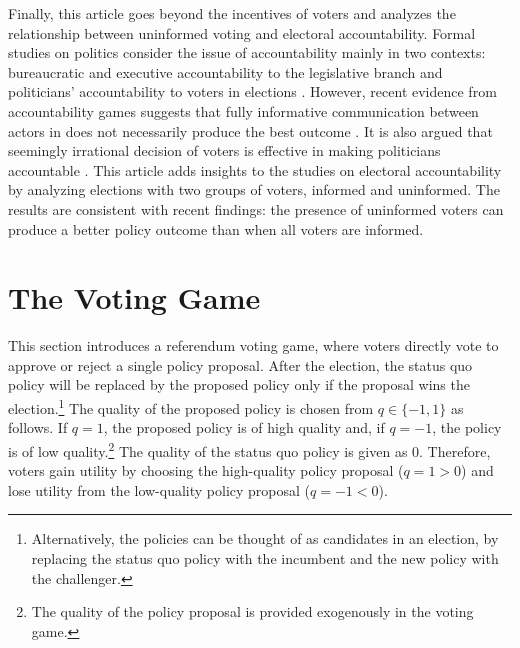 \documentclass[doc,natbib,12pt]{apa6}
\begin{document}
	\par Finally, this article goes beyond the incentives of voters and analyzes the relationship between uninformed voting and electoral accountability. Formal studies on politics consider the issue of accountability mainly in two contexts: bureaucratic and executive accountability to the legislative branch \citep[e.g.,][]{Gailmard2013lewh, Patty2017expo} and politicians' accountability to voters in elections \citep[e.g.,][]{Ashworth2012elac, Prato2016thvo}. However, recent evidence from accountability games suggests that fully informative communication between actors in does not necessarily produce the best outcome \citep{Patty2017expo, Prato2016thvo}. It is also argued that seemingly irrational decision of voters is effective in making politicians accountable \citep{Gailmard2018prpr}. This article adds insights to the studies on electoral accountability by analyzing elections with two groups of voters, informed and uninformed. The results are consistent with recent findings: the presence of uninformed voters can produce a better policy outcome than when all voters are informed. 
	
	\section{The Voting Game}
	
	\par This section introduces a referendum voting game, where voters directly vote to approve or reject a single policy proposal. After the election, the status quo policy will be replaced by the proposed policy only if the proposal wins the election.\footnote{Alternatively, the policies can be thought of as candidates in an election, by replacing the status quo policy with the incumbent and the new policy with the challenger.} The quality of the proposed policy is chosen from $q \in \{-1, 1\}$ as follows. If $q=1$, the proposed policy is of high quality and, if $q=-1$, the policy is of low quality.\footnote{The quality of the policy proposal is provided exogenously in the voting game.} The quality of the status quo policy is given as $0$. Therefore, voters gain utility by choosing the high-quality policy proposal ($q=1>0$) and lose utility from the low-quality policy proposal ($q=-1<0$).
	
\end{document}
